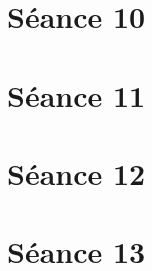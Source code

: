 \documentclass[a4paper, 12pt]{article}
\begin{document}


\section{Séance 10}



\section{Séance 11}



\section{Séance 12}



\section{Séance 13}


\end{document}
